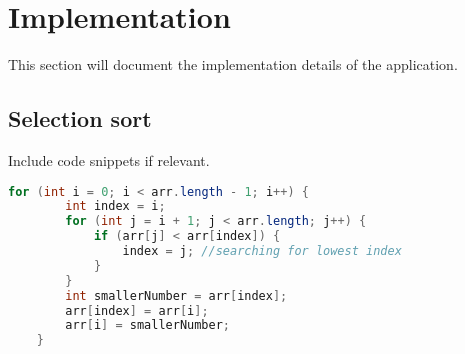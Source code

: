 \section{Implementation}
This section will document the implementation details of the application. 

\subsection{Selection sort}
Include code snippets if relevant.
\begin{lstlisting}[language=Java]
    for (int i = 0; i < arr.length - 1; i++) {
        int index = i;
        for (int j = i + 1; j < arr.length; j++) {
            if (arr[j] < arr[index]) {
                index = j; //searching for lowest index
            }
        }
        int smallerNumber = arr[index]; 
        arr[index] = arr[i];
        arr[i] = smallerNumber;
    }
\end{lstlisting}